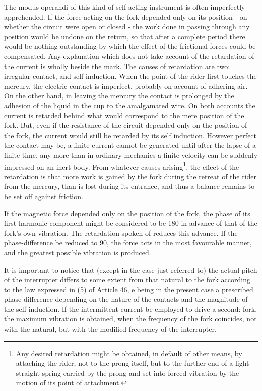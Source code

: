The modus operandi of this kind of self-acting instrument is often imperfectly
apprehended. If the force acting on the fork depended only on its position - on
whether the circuit were open or closed - the work done in passing through any
position would be undone on the return, so that after a complete period there
would be nothing outstanding by which the effect of the frictional forces could
be compensated. Any explanation which does not take account of the retardation
of the current is wholly beside the mark. The causes of retardation are two:
irregular contact, and self-induction. When the point of the rider first
touches the mercury, the electric contact is imperfect, probably on account of
adhering air. On the other hand, in leaving the mercury the contact is
prolonged by the adhesion of the liquid in the cup to the amalgamated wire. On
both accounts the current is retarded behind what would correspond to the mere
position of the fork. But, even if the resistance of the circuit depended only
on the position of the fork, the current would still be retarded by its self
induction. However perfect the contact may be, a finite current cannot be
generated until after the lapse of a finite time, any more than in ordinary
mechanics a finite velocity can be suddenly impressed on an inert body. From
whatever causes arising\footnote{Any desired retardation might be obtained, in
default of other means, by attaching the rider, not to the prong itself, but to
the further end of a light straight spring carried by the prong and set into
forced vibration by the motion of its point of attachment.}, the effect of the
retardation is that more work is gained by the fork during the retreat of the
rider from the mercury, than is lost during its entrance, and thus a balance
remains to be set off against friction.

If the magnetic force depended only on the position of the fork, the phase of
its first harmonic component might be considered to be 180 in advance of that
of the fork's own vibration.  The retardation spoken of reduces this advance.
If the phase-difference be reduced to 90, the force acts in the most favourable
manner, and the greatest possible vibration is produced.

It is important to notice that (except in the case just referred to) the actual
pitch of the interrupter differs to some extent from that natural to the fork
according to the law expressed in (5) of Article 46, e being in the present
case a prescribed phase-difference depending on the nature of the contacts and
the magnitude of the self-induction. If the intermittent current be employed to
drive a second: fork, the maximum vibration is obtained, when the frequency of
the fork coincides, not with the natural, but with the modified frequency of
the interrupter.

